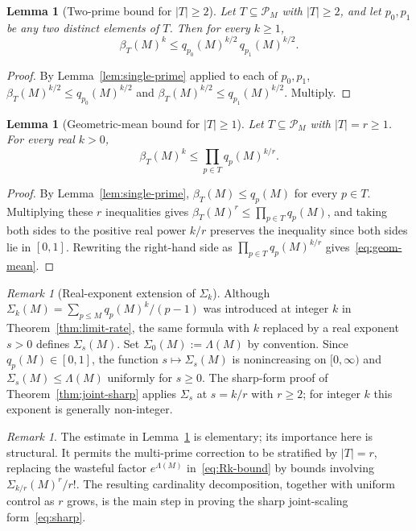 \documentclass[11pt]{article}
\newtheorem{lemma}[theorem]{Lemma}
\theoremstyle{remark}
\newtheorem{remark}[theorem]{Remark}
\newcommand{\PM}{\mathcal{P}_M}
\begin{document}
\begin{lemma}[Two-prime bound for $|T| \geq 2$]\label{lem:two-prime}
Let $T \subseteq \PM$ with $|T| \geq 2$, and let $p_0, p_1$ be any two distinct elements of $T$. Then for every $k \geq 1$,
\[
\beta_T(M)^k \leq q_{p_0}(M)^{k/2}\, q_{p_1}(M)^{k/2}.
\]
\end{lemma}
\begin{proof}
By Lemma~\ref{lem:single-prime} applied to each of $p_0, p_1$, $\beta_T(M)^{k/2} \leq q_{p_0}(M)^{k/2}$ and $\beta_T(M)^{k/2} \leq q_{p_1}(M)^{k/2}$. Multiply.
\end{proof}

\begin{lemma}[Geometric-mean bound for $|T| \geq 1$]\label{lem:geom-mean}
Let $T \subseteq \PM$ with $|T| = r \geq 1$. For every real $k > 0$,
\begin{equation}\label{eq:geom-mean}
\beta_T(M)^k \leq \prod_{p \in T} q_p(M)^{k/r}.
\end{equation}
\end{lemma}
\begin{proof}
By Lemma~\ref{lem:single-prime}, $\beta_T(M) \leq q_p(M)$ for every $p \in T$. Multiplying these $r$ inequalities gives $\beta_T(M)^r \leq \prod_{p \in T} q_p(M)$, and taking both sides to the positive real power $k/r$ preserves the inequality since both sides lie in $[0, 1]$. Rewriting the right-hand side as $\prod_{p \in T} q_p(M)^{k/r}$ gives~\eqref{eq:geom-mean}.
\end{proof}

\begin{remark}[Real-exponent extension of $\Sigma_k$]\label{rem:sigma-real}
Although $\Sigma_k(M) = \sum_{p \leq M} q_p(M)^k/(p-1)$ was introduced at integer $k$ in Theorem~\ref{thm:limit-rate}, the same formula with $k$ replaced by a real exponent $s>0$ defines $\Sigma_s(M)$. Set $\Sigma_0(M):=\Lambda(M)$ by convention. Since $q_p(M)\in[0,1]$, the function $s\mapsto\Sigma_s(M)$ is nonincreasing on $[0,\infty)$ and $\Sigma_s(M)\leq\Lambda(M)$ uniformly for $s\geq0$. The sharp-form proof of Theorem~\ref{thm:joint-sharp} applies $\Sigma_s$ at $s=k/r$ with $r\geq2$; for integer $k$ this exponent is generally non-integer.
\end{remark}

\begin{remark}\label{rem:why-geom-mean}
The estimate in Lemma~\ref{lem:geom-mean} is elementary; its importance here is structural. It permits the multi-prime correction to be stratified by $|T|=r$, replacing the wasteful factor $e^{\Lambda(M)}$ in~\eqref{eq:Rk-bound} by bounds involving $\Sigma_{k/r}(M)^r/r!$. The resulting cardinality decomposition, together with uniform control as $r$ grows, is the main step in proving the sharp joint-scaling form~\eqref{eq:sharp}.
\end{remark}
\end{document}
